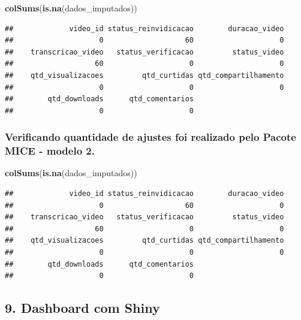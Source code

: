 \documentclass[
]{article}
\newenvironment{Shaded}{\begin{snugshade}}{\end{snugshade}}
\newcommand{\FunctionTok}[1]{\textcolor[rgb]{0.13,0.29,0.53}{\textbf{#1}}}
\newcommand{\NormalTok}[1]{#1}
\begin{document}
\begin{Shaded}
\begin{Highlighting}[]
\FunctionTok{colSums}\NormalTok{(}\FunctionTok{is.na}\NormalTok{(dados\_imputados))}
\end{Highlighting}
\end{Shaded}

\begin{verbatim}
##             video_id status_reinvidicacao        duracao_video 
##                    0                   60                    0 
##    transcricao_video   status_verificacao         status_video 
##                   60                    0                    0 
##    qtd_visualizacoes         qtd_curtidas qtd_compartilhamento 
##                    0                    0                    0 
##        qtd_downloads      qtd_comentarios 
##                    0                    0
\end{verbatim}

\subsubsection{Verificando quantidade de ajustes foi realizado pelo
Pacote MICE - modelo
2.}\label{verificando-quantidade-de-ajustes-foi-realizado-pelo-pacote-mice---modelo-2.}

\begin{Shaded}
\begin{Highlighting}[]
\FunctionTok{colSums}\NormalTok{(}\FunctionTok{is.na}\NormalTok{(dados\_imputados))}
\end{Highlighting}
\end{Shaded}

\begin{verbatim}
##             video_id status_reinvidicacao        duracao_video 
##                    0                   60                    0 
##    transcricao_video   status_verificacao         status_video 
##                   60                    0                    0 
##    qtd_visualizacoes         qtd_curtidas qtd_compartilhamento 
##                    0                    0                    0 
##        qtd_downloads      qtd_comentarios 
##                    0                    0
\end{verbatim}

\subsection{9. Dashboard com Shiny}\label{dashboard-com-shiny}
\end{document}
